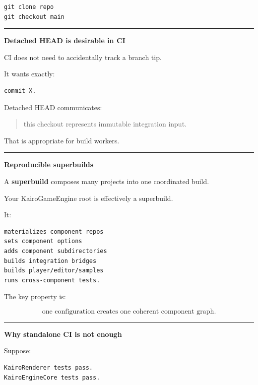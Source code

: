 \begin{verbatim}
git clone repo
git checkout main
\end{verbatim}

\begin{center}\rule{0.5\linewidth}{0.5pt}\end{center}

\textbf{Detached HEAD is desirable in CI}

CI does not need to accidentally track a branch tip.

It wants exactly:

\begin{verbatim}
commit X.
\end{verbatim}

Detached HEAD communicates:

\begin{quote}
this checkout represents immutable integration input.
\end{quote}

That is appropriate for build workers.

\begin{center}\rule{0.5\linewidth}{0.5pt}\end{center}

\textbf{Reproducible superbuilds}

A \textbf{superbuild} composes many projects into one coordinated build.

Your KairoGameEngine root is effectively a superbuild.

It:

\begin{verbatim}
materializes component repos
sets component options
adds component subdirectories
builds integration bridges
builds player/editor/samples
runs cross-component tests.
\end{verbatim}

The key property is:

\[
\boxed{
\text{one configuration creates one coherent component graph}.
}
\]

\begin{center}\rule{0.5\linewidth}{0.5pt}\end{center}

\textbf{Why standalone CI is not enough}

Suppose:

\begin{verbatim}
KairoRenderer tests pass.
KairoEngineCore tests pass.
\end{verbatim}

